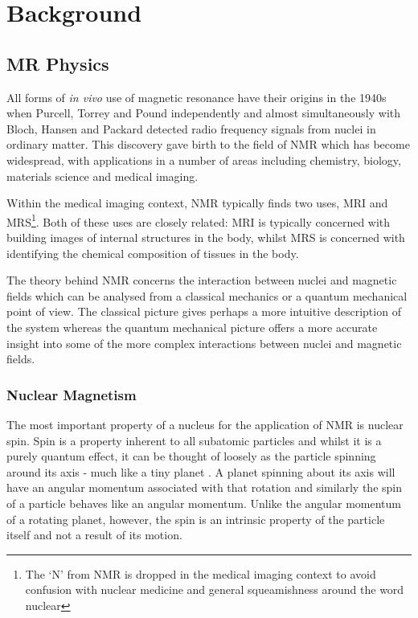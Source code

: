 \renewcommand{\BrainFuckChapter}{}
\renewcommand{\LifeChapter}{y}
\chapter{Background}
\label{sec:background}

\section{MR Physics}
\label{sec:bg_mri_physics}
All forms of \emph{in vivo} use of magnetic resonance have their origins in the 1940s when Purcell, Torrey and Pound independently and almost simultaneously with Bloch, Hansen and Packard detected radio frequency signals from nuclei in ordinary matter\cite{Levitt2008, Barker2009}.
This discovery gave birth to the field of \ac{NMR} which has become widespread, with applications in a number of areas including chemistry, biology, materials science and medical imaging\cite{Barker2009, Salibi1998}.

Within the medical imaging context, \ac{NMR} typically finds two uses, \acf{MRI} and \ac{MRS}\footnote{The `N' from NMR is dropped in the medical imaging context to avoid confusion with nuclear medicine and general squeamishness around the word nuclear}.
Both of these uses are closely related: \ac{MRI} is typically concerned with building images of internal structures in the body, whilst \ac{MRS} is concerned with identifying the chemical composition of tissues in the body.

The theory behind \ac{NMR} concerns the interaction between nuclei and magnetic fields which can be analysed from a classical mechanics or a quantum mechanical point of view. 
The classical picture gives perhaps a more intuitive description of the system whereas the quantum mechanical picture offers a more accurate insight into some of the more complex interactions between nuclei and magnetic fields. 

\subsection{Nuclear Magnetism}
\label{sec:bg_nuclearmagnetism}

The most important property of a nucleus for the application of \ac{NMR} is nuclear spin. 
Spin is a property inherent to all subatomic particles and whilst it is a purely quantum effect, it can be thought of loosely as the particle spinning around its axis - much like a tiny planet \cite{Levitt2008}.
A planet spinning about its axis will have an angular momentum associated with that rotation and similarly the spin of a particle behaves like an angular momentum.
Unlike the angular momentum of a rotating planet, however, the spin is an intrinsic property of the particle itself and not a result of its motion\cite{Levitt2008}.

